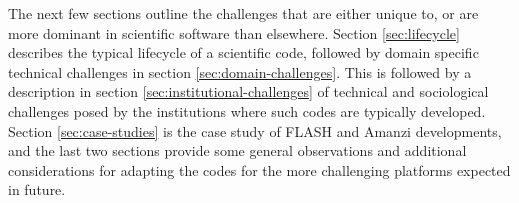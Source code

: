 The next few sections outline the challenges that  
are either unique to, or are more dominant in scientific
software than elsewhere. Section \ref{sec:lifecycle} describes the
typical lifecycle of a scientific code, followed by domain specific
technical challenges in section \ref{sec:domain-challenges}. This is
followed by a description in section \ref{sec:institutional-challenges}
of technical and sociological challenges posed by the institutions
where such codes are typically developed. Section
\ref{sec:case-studies} is the case study of FLASH and Amanzi
developments, and the last two sections provide some general
observations and additional considerations for adapting the
codes for the more challenging platforms expected in future.


